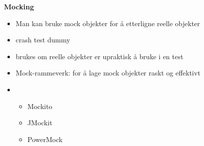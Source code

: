 \documentclass{article}
\begin{document}
\begin{flushleft}
        \textbf{Mocking}
        \begin{itemize}
            \item Man kan bruke mock objekter for å etterligne reelle objekter
            \item crash test dummy
            \item brukes om reelle objekter er upraktisk å bruke i en test
            \item Mock-rammeverk: for å lage mock objekter raskt og effektivt
            \item \begin{itemize}
                \item Mockito
                \item JMockit
                \item PowerMock
            \end{itemize}
        \end{itemize}




    \end{flushleft}
\end{document}
